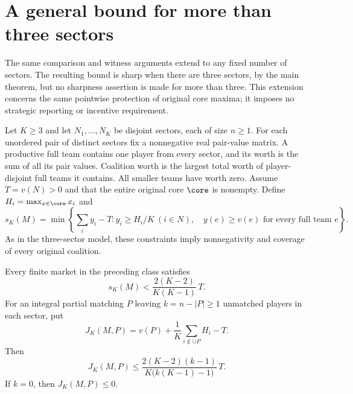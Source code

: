 \section{A general bound for more than three sectors}\label{four:section}
The same comparison and witness arguments extend to any fixed number of
sectors. The resulting bound is sharp when there are three sectors, by the
main theorem, but no sharpness assertion is made for more than three.
This extension concerns the same pointwise protection of original core
maxima; it imposes no strategic reporting or incentive requirement.

Let $K\ge3$ and let $N_1,\ldots,N_K$ be disjoint sectors, each of size
$n\ge1$. For each unordered pair of distinct sectors fix a nonnegative
real pair-value matrix. A productive full team contains one player from
every sector, and its worth is the sum of all its pair values. Coalition
worth is the largest total worth of player-disjoint full teams it contains.
All smaller teams have worth zero. Assume $T=v(N)>0$ and that the entire
original core $\core$ is nonempty. Define $H_i=\max_{x\in\core}x_i$ and
\[
 s_K(M)=\min\left\{\sum_i y_i-T:
       y_i\ge H_i/K\ (i\in N),\quad y(e)\ge v(e)
       \text{ for every full team }e\right\}.
\]
As in the three-sector model, these constraints imply nonnegativity and
coverage of every original coalition.

\begin{theorem}\label{four:main}
Every finite market in the preceding class satisfies
\begin{equation}\label{four:universal}
             s_K(M)<\frac{2(K-2)}{K(K-1)}\,T.
\end{equation}
For an integral partial matching $P$ leaving $k=n-|P|\ge1$ unmatched
players in each sector, put
\[
 J_K(M,P)=v(P)+\frac1K\sum_{i\notin\cup P}H_i-T.
\]
Then
\begin{equation}\label{four:integral}
 J_K(M,P)\le
       \frac{2(K-2)(k-1)}{K\bigl(k(K-1)-1\bigr)}\,T.
\end{equation}
If $k=0$, then $J_K(M,P)\le0$.
\end{theorem}

